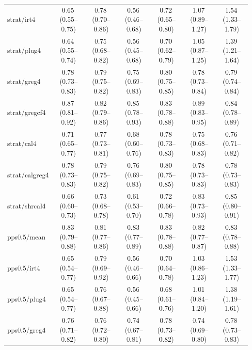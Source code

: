 \begin{tabular}{lcccccc}
strat/irt4 & 0.65\,\scriptsize(0.55--0.75) & 0.78\,\scriptsize(0.70--0.86) & 0.56\,\scriptsize(0.46--0.68) & 0.72\,\scriptsize(0.65--0.80) & 1.07\,\scriptsize(0.89--1.27) & 1.54\,\scriptsize(1.33--1.79) \\
strat/plug4 & 0.64\,\scriptsize(0.55--0.74) & 0.75\,\scriptsize(0.68--0.82) & 0.56\,\scriptsize(0.45--0.68) & 0.70\,\scriptsize(0.62--0.79) & 1.05\,\scriptsize(0.87--1.25) & 1.39\,\scriptsize(1.21--1.64) \\
strat/greg4 & 0.78\,\scriptsize(0.73--0.83) & 0.79\,\scriptsize(0.75--0.82) & 0.75\,\scriptsize(0.69--0.83) & 0.80\,\scriptsize(0.75--0.85) & 0.78\,\scriptsize(0.73--0.84) & 0.79\,\scriptsize(0.74--0.84) \\
strat/gregcf4 & 0.87\,\scriptsize(0.81--0.92) & 0.82\,\scriptsize(0.79--0.86) & 0.85\,\scriptsize(0.78--0.93) & 0.83\,\scriptsize(0.78--0.88) & 0.89\,\scriptsize(0.83--0.95) & 0.84\,\scriptsize(0.78--0.89) \\
strat/cal4 & 0.71\,\scriptsize(0.65--0.77) & 0.77\,\scriptsize(0.73--0.81) & 0.68\,\scriptsize(0.60--0.76) & 0.78\,\scriptsize(0.73--0.83) & 0.75\,\scriptsize(0.68--0.83) & 0.76\,\scriptsize(0.71--0.82) \\
strat/calgreg4 & 0.78\,\scriptsize(0.73--0.83) & 0.79\,\scriptsize(0.75--0.82) & 0.76\,\scriptsize(0.69--0.83) & 0.80\,\scriptsize(0.75--0.85) & 0.78\,\scriptsize(0.73--0.83) & 0.78\,\scriptsize(0.73--0.83) \\
strat/shrcal4 & 0.66\,\scriptsize(0.60--0.73) & 0.73\,\scriptsize(0.68--0.78) & 0.61\,\scriptsize(0.53--0.70) & 0.72\,\scriptsize(0.66--0.78) & 0.83\,\scriptsize(0.73--0.93) & 0.85\,\scriptsize(0.80--0.91) \\
pps0.5/mean & 0.83\,\scriptsize(0.79--0.88) & 0.81\,\scriptsize(0.77--0.86) & 0.83\,\scriptsize(0.77--0.89) & 0.83\,\scriptsize(0.78--0.88) & 0.82\,\scriptsize(0.77--0.87) & 0.83\,\scriptsize(0.78--0.88) \\
pps0.5/irt4 & 0.65\,\scriptsize(0.54--0.77) & 0.79\,\scriptsize(0.69--0.92) & 0.56\,\scriptsize(0.46--0.66) & 0.70\,\scriptsize(0.64--0.78) & 1.03\,\scriptsize(0.86--1.23) & 1.53\,\scriptsize(1.33--1.77) \\
pps0.5/plug4 & 0.65\,\scriptsize(0.54--0.77) & 0.76\,\scriptsize(0.67--0.88) & 0.56\,\scriptsize(0.45--0.66) & 0.68\,\scriptsize(0.61--0.76) & 1.01\,\scriptsize(0.84--1.20) & 1.38\,\scriptsize(1.19--1.61) \\
pps0.5/greg4 & 0.76\,\scriptsize(0.71--0.82) & 0.76\,\scriptsize(0.72--0.80) & 0.74\,\scriptsize(0.67--0.81) & 0.78\,\scriptsize(0.73--0.82) & 0.74\,\scriptsize(0.69--0.80) & 0.78\,\scriptsize(0.73--0.83) \\

\end{tabular}
